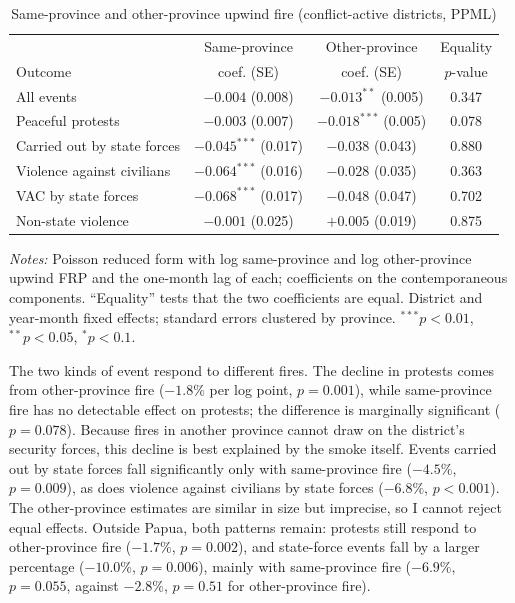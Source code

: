 \documentclass[12pt]{article}
\begin{document}
\begin{table}[!htbp]
\centering
\caption{Same-province and other-province upwind fire (conflict-active districts, PPML)}
\label{tab:province}
\small
\begin{tabular}{lccc}
\toprule
 & Same-province & Other-province & Equality \\
Outcome & coef. (SE) & coef. (SE) & $p$-value \\
\midrule
All events & $-0.004$ (0.008) & $-0.013^{**}$ (0.005) & 0.347 \\
Peaceful protests & $-0.003$ (0.007) & $-0.018^{***}$ (0.005) & 0.078 \\
Carried out by state forces & $-0.045^{***}$ (0.017) & $-0.038$ (0.043) & 0.880 \\
Violence against civilians & $-0.064^{***}$ (0.016) & $-0.028$ (0.035) & 0.363 \\
VAC by state forces & $-0.068^{***}$ (0.017) & $-0.048$ (0.047) & 0.702 \\
Non-state violence & $-0.001$ (0.025) & $+0.005$ (0.019) & 0.875 \\
\bottomrule
\end{tabular}
\begin{minipage}{0.95\textwidth}
\vspace{4pt}
\footnotesize \emph{Notes:} Poisson reduced form with log same-province and log other-province upwind FRP and the one-month lag of each; coefficients on the contemporaneous components. ``Equality'' tests that the two coefficients are equal. District and year-month fixed effects; standard errors clustered by province. $^{***}p<0.01$, $^{**}p<0.05$, $^{*}p<0.1$.
\end{minipage}
\end{table}

The two kinds of event respond to different fires. The decline in protests comes from other-province fire ($-1.8\%$ per log point, $p=0.001$), while same-province fire has no detectable effect on protests; the difference is marginally significant ($p=0.078$). Because fires in another province cannot draw on the district's security forces, this decline is best explained by the smoke itself. Events carried out by state forces fall significantly only with same-province fire ($-4.5\%$, $p=0.009$), as does violence against civilians by state forces ($-6.8\%$, $p<0.001$). The other-province estimates are similar in size but imprecise, so I cannot reject equal effects. Outside Papua, both patterns remain: protests still respond to other-province fire ($-1.7\%$, $p=0.002$), and state-force events fall by a larger percentage ($-10.0\%$, $p=0.006$), mainly with same-province fire ($-6.9\%$, $p=0.055$, against $-2.8\%$, $p=0.51$ for other-province fire).
\end{document}
